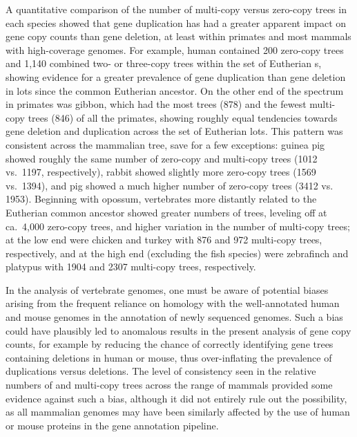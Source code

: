 A quantitative comparison of the number of multi-copy versus zero-copy
trees in each species showed that gene duplication has had a greater
apparent impact on gene copy counts than gene deletion, at least
within primates and most mammals with high-coverage genomes. For
example, human contained 200 zero-copy trees and 1,140 combined two-
or three-copy trees within the set of Eutherian \subtr{}s, showing
evidence for a greater prevalence of gene duplication than gene
deletion in \acp{lot} since the common Eutherian ancestor. On the
other end of the spectrum in primates was gibbon, which had the most
\zcop trees (878) and the fewest multi-copy trees (846) of all the
primates, showing roughly equal tendencies towards gene deletion and
duplication across the set of Eutherian \acp{lot}. This pattern was
consistent across the mammalian tree, save for a few exceptions:
guinea pig showed roughly the same number of zero-copy and multi-copy
trees (1012 vs.~1197, respectively), rabbit showed slightly more
zero-copy trees (1569 vs.~1394), and pig showed a much higher number
of zero-copy trees (3412 vs. 1953). Beginning with opossum,
vertebrates more distantly related to the Eutherian common ancestor
showed greater numbers of \zcop trees, leveling off at ca.~4,000
zero-copy trees, and higher variation in the number of multi-copy
trees; at the low end were chicken and turkey with 876 and 972
multi-copy trees, respectively, and at the high end (excluding the
fish species) were zebrafinch and platypus with 1904 and 2307
multi-copy trees, respectively.

In the analysis of vertebrate genomes, one must be aware of potential
biases arising from the frequent reliance on homology with the
well-annotated human and mouse genomes in the annotation of newly
sequenced genomes. Such a bias could have plausibly led to anomalous
results in the present analysis of gene copy counts, for example by
reducing the chance of correctly identifying gene trees containing
deletions in human or mouse, thus over-inflating the prevalence of
duplications versus deletions. The level of consistency seen in the
relative numbers of \zcop and multi-copy trees across the range of
mammals provided some evidence against such a bias, although it did
not entirely rule out the possibility, as all mammalian genomes may
have been similarly affected by the use of human or mouse proteins in
the \ens gene annotation pipeline.

